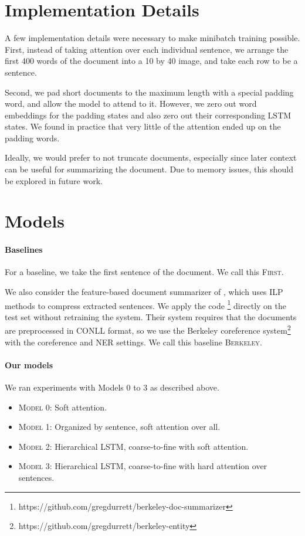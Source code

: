 \documentclass[12pt]{report}
\begin{document}
\section{Implementation Details}

A few implementation details were necessary to make minibatch training possible. First, instead of taking attention over each individual sentence, we arrange the first 400 words of the document into a 10 by 40 image, and take each row to be a sentence.

Second, we pad short documents to the maximum length with a special padding word, and allow the model to attend to it. However, we zero out word embeddings for the padding states and also zero out their corresponding LSTM states. We found in practice that very little of the attention ended up on the padding words.

Ideally, we would prefer to not truncate documents, especially since later context can be useful for summarizing the document. Due to memory issues, this should be explored in future work.

\section{Models}

\paragraph{Baselines}
For a baseline, we take the first sentence of the document. We call this \textsc{First}.

We also consider the feature-based document summarizer of \citet{Durrett2016}, which uses ILP methods to compress extracted sentences. We apply the code \footnote{https://github.com/gregdurrett/berkeley-doc-summarizer} directly on the test set without retraining the system. Their system requires that the documents are preprocessed in CONLL format, so we use the Berkeley coreference system\footnote{https://github.com/gregdurrett/berkeley-entity} with the coreference and NER settings. We call this baseline \textsc{Berkeley}.

\paragraph{Our models}

We ran experiments with Models 0 to 3 as described above.

\begin{itemize}
\item \textsc{Model 0}: Soft attention.
\item \textsc{Model 1}: Organized by sentence, soft attention over all.
\item \textsc{Model 2}: Hierarchical LSTM, coarse-to-fine with soft attention.
\item \textsc{Model 3}: Hierarchical LSTM, coarse-to-fine with hard attention over sentences.
\end{itemize}
\end{document}
